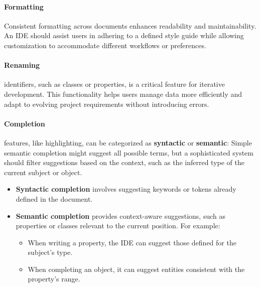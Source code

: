 \paragraph*{Formatting} 
Consistent formatting across documents enhances readability and maintainability.
An IDE should assist users in adhering to a defined style guide while allowing customization to accommodate different workflows or preferences.

\paragraph*{Renaming} identifiers, such as classes or properties, is a critical feature for iterative development.
This functionality helps users manage data more efficiently and adapt to evolving project requirements without introducing errors.

\paragraph*{Completion} features, like highlighting, can be categorized as \textbf{syntactic} or \textbf{semantic}:
Simple semantic completion might suggest all possible terms, but a sophisticated system should filter suggestions based on the context, such as the inferred type of the current subject or object.

\begin{itemize}
    \item \textbf{Syntactic completion} involves suggesting keywords or tokens already defined in the document.
    \item \textbf{Semantic completion} provides context-aware suggestions, such as properties or classes relevant to the current position. For example:
    \begin{itemize}
        \item When writing a property, the IDE can suggest those defined for the subject's type.
        \item When completing an object, it can suggest entities consistent with the property's range.
    \end{itemize}
\end{itemize}


